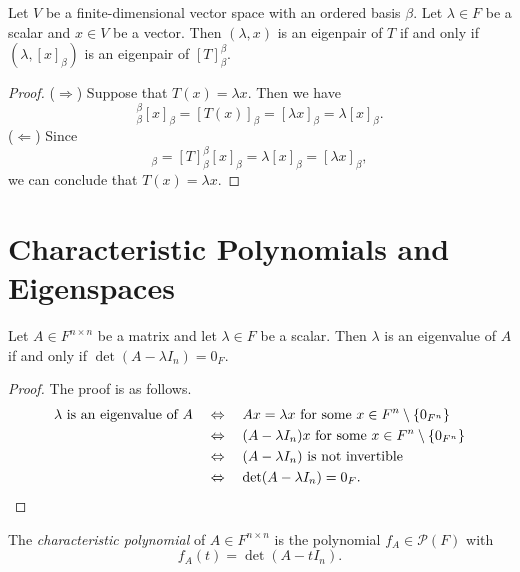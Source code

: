 \begin{theorem}
  Let $V$ be a finite-dimensional vector space with an ordered basis $\beta$.
  Let $\lambda \in F$ be a scalar and $x \in V$ be a vector.
  Then $(\lambda, x)$ is an eigenpair of $T$ if and only if
  $(\lambda, [x]_\beta)$ is an eigenpair of $[T]_\beta^\beta$.
\end{theorem}
\begin{proof}
  ($\Rightarrow$)
  Suppose that $T(x) = \lambda x$.
  Then we have
  \begin{equation*}
    [T]_\beta^\beta[x]_\beta
    = [T(x)]_\beta
    = [\lambda x]_\beta
    = \lambda [x]_\beta.
  \end{equation*}
  ($\Leftarrow$)
  Since
  \begin{equation*}
    [T(x)]_\beta
    = [T]_\beta^\beta[x]_\beta
    = \lambda[x]_\beta
    = [\lambda x]_\beta,
  \end{equation*}
  we can conclude that $T(x) = \lambda x$.
\end{proof}

\section{Characteristic Polynomials and Eigenspaces}
\begin{theorem}
  \label{thm:eigenvalue-condition}
  Let $A \in F^{n \times n}$ be a matrix and let $\lambda \in F$ be a scalar.
  Then $\lambda$ is an eigenvalue of $A$ if and only if
  $\det(A - \lambda I_n) = 0_F$.
\end{theorem}
\begin{proof}
  The proof is as follows.
  \begin{align*}
    \text{$\lambda$ is an eigenvalue of $A$}
    &\quad \Leftrightarrow \quad
    \text{$Ax = \lambda x$ for some $x \in F^n \setminus \{0_{F^n}\}$} \\
    &\quad \Leftrightarrow \quad
    \text{$(A - \lambda I_n)x$ for some $x \in F^n \setminus \{0_{F^n}\}$} \\
    &\quad \Leftrightarrow \quad
    \text{$(A - \lambda I_n)$ is not invertible} \\
    &\quad \Leftrightarrow \quad \det(A - \lambda I_n) = 0_F.
    \qedhere
  \end{align*}
\end{proof}

\begin{definition}
  The \emph{characteristic polynomial} of $A \in F^{n \times n}$ is the
  polynomial $f_A \in \mathcal{P}(F)$ with
  \begin{equation*}
    f_A(t) = \det(A - tI_n).
  \end{equation*}
\end{definition}

